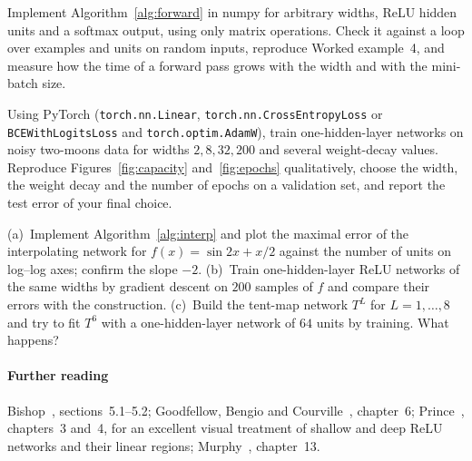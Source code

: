 \documentclass[11pt]{article}
\begin{document}
\begin{questions}
\begin{programming}
\item Implement Algorithm~\ref{alg:forward} in numpy for arbitrary widths, ReLU hidden units and a softmax output, using
  only matrix operations. Check it against a loop over examples and units on random inputs, reproduce Worked
  example~4, and measure how the time of a forward pass grows with the width and with the mini-batch size.
\item Using PyTorch (\texttt{torch.nn.Linear}, \texttt{torch.nn.CrossEntropyLoss} or \texttt{BCEWithLogitsLoss} and
  \texttt{torch.optim.AdamW}), train one-hidden-layer networks on noisy two-moons data for widths $2, 8, 32, 200$ and
  several weight-decay values. Reproduce Figures~\ref{fig:capacity} and~\ref{fig:epochs} qualitatively, choose the width,
  the weight decay and the number of epochs on a validation set, and report the test error of your final choice.
\item (a)~Implement Algorithm~\ref{alg:interp} and plot the maximal error of the interpolating network for $f(x) = \sin 2x
  + x/2$ against the number of units on log--log axes; confirm the slope $-2$. (b)~Train one-hidden-layer ReLU networks of
  the same widths by gradient descent on $200$ samples of $f$ and compare their errors with the construction. (c)~Build
  the tent-map network $T^L$ for $L = 1, \dots, 8$ and try to fit $T^6$ with a one-hidden-layer network of $64$ units by
  training. What happens?
\end{programming}
\end{questions}

\paragraph{Further reading} Bishop~\cite{bishop2006}, sections~5.1--5.2; Goodfellow, Bengio and
Courville~\cite{goodfellow2016}, chapter~6; Prince~\cite{prince2023}, chapters~3 and~4, for an excellent visual treatment
of shallow and deep ReLU networks and their linear regions; Murphy~\cite{murphy2022}, chapter~13.
\end{document}
